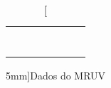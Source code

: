 \begin{table*}[!ht]
\begin{tabular}{lp{25mm}p{25mm}p{25mm}p{25mm}p{25mm}l}
	& \cellcolor[gray]{0.95} & \cellcolor[gray]{0.97} & \cellcolor[gray]{0.95} \\ 
	& \cellcolor[gray]{0.89} & \cellcolor[gray]{0.92} & \cellcolor[gray]{0.89} \\ 
	& \cellcolor[gray]{0.95} & \cellcolor[gray]{0.97} & \cellcolor[gray]{0.95} \\ 
	& \cellcolor[gray]{0.89} & \cellcolor[gray]{0.92} & \cellcolor[gray]{0.89} \\ 
	& \cellcolor[gray]{0.95} & \cellcolor[gray]{0.97} & \cellcolor[gray]{0.95} \\ 
	& \cellcolor[gray]{0.89} & \cellcolor[gray]{0.92} & \cellcolor[gray]{0.89} \\ 
	& \cellcolor[gray]{0.95} & \cellcolor[gray]{0.97} & \cellcolor[gray]{0.95} \\ 
	\cmidrule{2-4}
\bottomrule
\end{tabular}
\caption[][5mm]{Dados do MRUV}
\label{DadosMRUV}
\end{table*}

